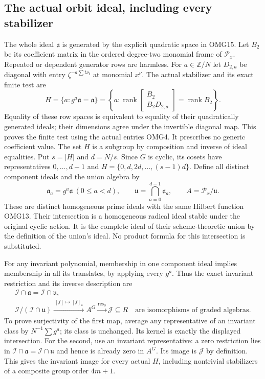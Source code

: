 \documentclass[11pt,a4paper]{article}
\begin{document}
\subsection{The actual orbit ideal, including every stabilizer}
The whole ideal $\mathfrak a$ is generated by the explicit quadratic
space in OMG15. Let $B_2$ be its coefficient matrix in the ordered
degree-two monomial frame of $\mathscr P_x$. Repeated or dependent
generator rows are harmless. For $a\in\mathbb Z/N$ let
$D_{2,a}$ be diagonal with entry $\zeta^{-a\sum t\nu_t}$ at
monomial $x^\nu$. The actual stabilizer and its exact finite test are
\[
 H=\{a:g^a\mathfrak a=\mathfrak a\}
   =\left\{a:\operatorname{rank}\begin{bmatrix}B_2\\B_2D_{2,a}\end{bmatrix}
                      =\operatorname{rank}B_2\right\}.
 \tag{OMG30}
\]
Equality of these row spaces is equivalent to equality of their
quadratically generated ideals; their dimensions agree under the
invertible diagonal map. This proves the finite test using the
actual entries OMG4. It prescribes no generic coefficient value.
The set $H$ is a subgroup by composition and inverse of ideal
equalities. Put $s=|H|$ and $d=N/s$. Since $G$ is cyclic, its
cosets have representatives $0,\ldots,d-1$ and
$H=\{0,d,2d,\ldots,(s-1)d\}$. Define all distinct component ideals
and the union algebra by
\[
 \mathfrak a_a=g^a\mathfrak a\ (0\le a<d),\qquad
 \mathfrak u=\bigcap_{a=0}^{d-1}\mathfrak a_a,
 \qquad A=\mathscr P_x/\mathfrak u.
 \tag{OMG31}
\]
These are distinct homogeneous prime ideals with the same Hilbert
function OMG13. Their intersection is a homogeneous radical ideal
stable under the original cyclic action. It is the complete ideal
of their scheme-theoretic union by the definition of the union's
ideal. No product formula for this intersection is substituted.

For any invariant polynomial, membership in one component ideal
implies membership in all its translates, by applying every $g^a$.
Thus the exact invariant restriction and its inverse description are
\[
\boxed{\begin{gathered}
 \mathscr I\cap\mathfrak a=\mathscr I\cap\mathfrak u,\\
 \mathscr I/(\mathscr I\cap\mathfrak u)
      \xrightarrow{\ [f]\mapsto[f]_{\mathfrak u}\ } A^G
      \xrightarrow{\operatorname{res}_0} \mathscr J\subseteq R
      \quad\text{are isomorphisms of graded algebras}.
\end{gathered}}\tag{OMG32}
\]
To prove surjectivity of the first map, average any representative
of an invariant class by $N^{-1}\sum g^a$; its class is unchanged.
Its kernel is exactly the displayed intersection. For the second,
use an invariant representative: a zero restriction lies in
$\mathscr I\cap\mathfrak a=\mathscr I\cap\mathfrak u$ and hence
is already zero in $A^G$. Its image is $\mathscr J$ by definition.
This gives the invariant image for every actual $H$, including
nontrivial stabilizers of a composite group order $4m+1$.
\end{document}
